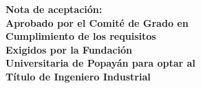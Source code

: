 
\begin{flushright}
    \textbf{Nota de aceptación:\\
    Aprobado por el Comité de Grado en\\
    Cumplimiento de los requisitos\\
    Exigidos por la Fundación\\
    Universitaria de Popayán para optar al\\
    Título de Ingeniero Industrial\\}

    \vspace{30 mm}

\end{flushright}